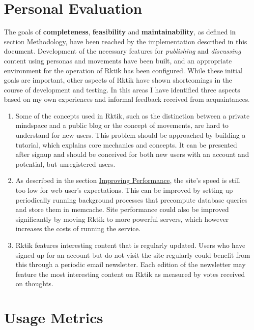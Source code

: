 \section{Personal Evaluation}\label{personal-evaluation}

The goals of \textbf{completeness}, \textbf{feasibility} and
\textbf{maintainability}, as defined in section
\hyperref[methodology]{Methodology}, have been reached by the
implementation described in this document. Development of the necessary
features for \emph{publishing} and \emph{discussing} content using
personas and movements have been built, and an appropriate environment
for the operation of Rktik has been configured. While these initial
goals are important, other aspects of Rktik have shown shortcomings in
the course of development and testing. In this areas I have identified
three aspects based on my own experiences and informal feedback received
from acquaintances.

\begin{enumerate}
\def\labelenumi{\arabic{enumi}.}
\item
  Some of the concepts used in Rktik, such as the distinction between a
  private mindspace and a public blog or the concept of movements, are
  hard to understand for new users. This problem should be approached by
  building a tutorial, which explains core mechanics and concepts. It
  can be presented after signup and should be conceived for both new
  users with an account and potential, but unregistered users.
\item
  As described in the section \hyperref[improving-performance]{Improving
  Performance}, the site's speed is still too low for web user's
  expectations. This can be improved by setting up periodically running
  background processes that precompute database queries and store them
  in memcache. Site performance could also be improved significantly by
  moving Rktik to more powerful servers, which however increases the
  costs of running the service.
\item
  Rktik features interesting content that is regularly updated. Users
  who have signed up for an account but do not visit the site regularly
  could benefit from this through a periodic email newsletter. Each
  edition of the newsletter may feature the most interesting content on
  Rktik as measured by votes received on thoughts.
\end{enumerate}

\section{Usage Metrics}\label{usage-metrics}


